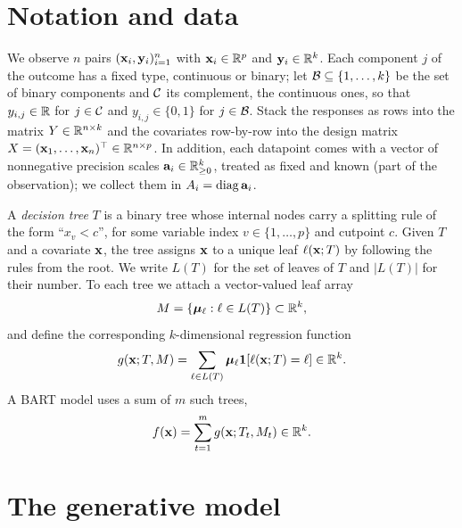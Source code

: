\section{Notation and data}
\label{sec:mv-notation}

We observe $n$ pairs $(\mathbf{x}_i, \mathbf{y}_i)_{i=1}^n$ with $\mathbf{x}_i \in \mathbb{R}^p$ and
$\mathbf{y}_i \in \mathbb{R}^k$. Each component $j$ of the outcome has a fixed type,
continuous or binary; let $\mathcal{B} \subseteq \{1, \dots, k\}$ be the set of
binary components and $\mathcal{C}$ its complement, the continuous ones, so that
$y_{i,j} \in \mathbb{R}$ for $j \in \mathcal{C}$ and $y_{i,j} \in \{0, 1\}$ for
$j \in \mathcal{B}$. Stack the responses as rows into the matrix
$Y \in \mathbb{R}^{n \times k}$ and the covariates row-by-row into the design matrix
$X = (\mathbf{x}_1, \dots, \mathbf{x}_n)^\top \in \mathbb{R}^{n \times p}$. In addition, each
datapoint comes with a vector of nonnegative precision scales
$\mathbf{a}_i \in \mathbb{R}^k_{\geq 0}$, treated as fixed and known (part of the
observation); we collect them in $A_i = \operatorname{diag}\mathbf{a}_i$.

A \emph{decision tree} $T$ is a binary tree whose internal nodes carry a
splitting rule of the form ``$x_{v} < c$'', for some variable index
$v \in \{1, \dots, p\}$ and cutpoint $c$. Given $T$ and a covariate $\mathbf{x}$, the
tree assigns $\mathbf{x}$ to a unique leaf $\ell(\mathbf{x}; T)$ by following the rules from
the root. We write $L(T)$ for the set of leaves of $T$ and
$|L(T)|$ for their number. To each tree we attach a vector-valued leaf array
\begin{equation}
	\label{eq:mv-leaf-array}
	M = \{ \bm{\mu}_\ell : \ell \in L(T) \} \subset \mathbb{R}^k,
\end{equation}
and define the corresponding $k$-dimensional regression function
\begin{equation}
	\label{eq:mv-g}
	g(\mathbf{x}; T, M) = \sum_{\ell \in L(T)} \bm{\mu}_\ell \mathbf{1}[\ell(\mathbf{x}; T) = \ell]
	\in \mathbb{R}^k.
\end{equation}
A BART model uses a sum of $m$ such trees,
\begin{equation}
	\label{eq:mv-sum-of-trees}
	f(\mathbf{x}) = \sum_{t=1}^m g(\mathbf{x}; T_t, M_t) \in \mathbb{R}^k.
\end{equation}

\section{The generative model}
\label{sec:mv-model}

